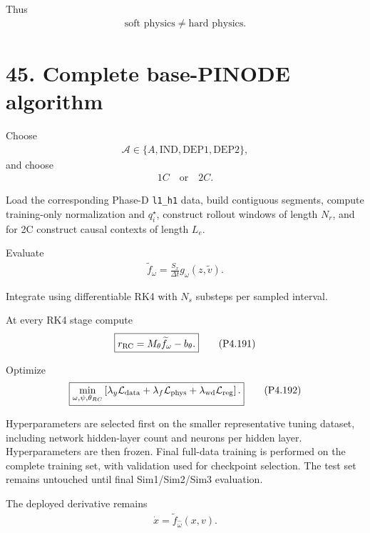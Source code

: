 \documentclass[11pt]{article}
\begin{document}
Thus
\begin{align}
\boxed{\text{soft physics}\neq\text{hard physics}.}
\tag{P4.189}
\end{align}

\section*{45. Complete base-PINODE algorithm}

Choose
\begin{align}
\boxed{
\mathcal A\in\{A,\mathrm{IND},\mathrm{DEP1},\mathrm{DEP2}\},
}
\end{align}
and choose
\begin{align}
\boxed{1C\quad\text{or}\quad2C.}
\end{align}

Load the corresponding Phase-D \texttt{l1\_h1} data, build contiguous segments, compute training-only normalization and \(q_i^\star\), construct rollout windows of length \(N_r\), and for 2C construct causal contexts of length \(L_e\).

Evaluate
\begin{align}
\boxed{
\widetilde f_\omega
=
\frac{S_x}{\Delta t}g_\omega(z,\widetilde v).
}
\tag{P4.190}
\end{align}

Integrate using differentiable RK4 with \(N_s\) substeps per sampled interval.

At every RK4 stage compute
\begin{align}
\boxed{
r_{\rm RC}
=
M_\theta\widetilde f_\omega-b_\theta.
}
\tag{P4.191}
\end{align}

Optimize
\begin{align}
\boxed{
\min_{\omega,\psi,\theta_{RC}}
\left[
\lambda_y\mathcal L_{\rm data}
+
\lambda_f\mathcal L_{\rm phys}
+
\lambda_{\rm wd}\mathcal L_{\rm reg}
\right].
}
\tag{P4.192}
\end{align}

Hyperparameters are selected first on the smaller representative tuning dataset, including network hidden-layer count and neurons per hidden layer. Hyperparameters are then frozen. Final full-data training is performed on the complete training set, with validation used for checkpoint selection. The test set remains untouched until final Sim1/Sim2/Sim3 evaluation.

The deployed derivative remains
\begin{align}
\boxed{
\dot x
=
\widetilde f_{\widehat\omega}(x,v).
}
\tag{P4.193}
\end{align}
\end{document}

